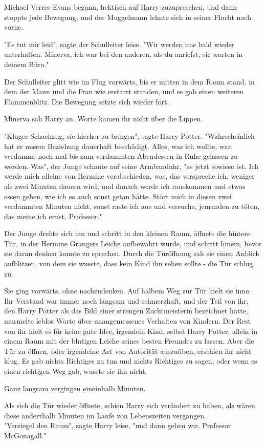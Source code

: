 {Michael Verres-Evans begann, hektisch auf Harry zuzupreschen, und dann stoppte jede Bewegung, und der Muggelmann lehnte sich in seiner Flucht nach vorne.

"Es tut mir leid", sagte der Schulleiter leise. "Wir werden uns bald wieder unterhalten. Minerva, ich war bei den anderen, als du anriefst, sie warten in deinem Büro."

Der Schulleiter glitt wie im Flug vorwärts, bis er mitten in dem Raum stand, in dem der Mann und die Frau wie erstarrt standen, und es gab einen weiteren Flammenblitz. Die Bewegung setzte sich wieder fort.

Minerva sah Harry an. Worte kamen ihr nicht über die Lippen.

"Kluger Schachzug, sie hierher zu bringen", sagte Harry Potter. "Wahrscheinlich hat er unsere Beziehung dauerhaft beschädigt. Alles, was ich wollte, war, verdammt noch mal bis zum verdammten Abendessen in Ruhe gelassen zu werden. Was", der Junge schaute auf seine Armbanduhr, "es jetzt sowieso ist. Ich werde mich alleine von Hermine verabschieden, was, das verspreche ich, weniger als zwei Minuten dauern wird, und danach werde ich rauskommen und etwas essen gehen, wie ich es auch sonst getan hätte. Stört mich in diesen zwei verdammten Minuten nicht, sonst raste ich aus und versuche, jemanden zu töten, das meine ich ernst, Professor."

Der Junge drehte sich um und schritt in den kleinen Raum, öffnete die hintere Tür, in der Hermine Grangers Leiche aufbewahrt wurde, und schritt hinein, bevor sie daran denken konnte zu sprechen. Durch die Türöffnung sah sie einen Anblick aufblitzen, von dem sie wusste, dass kein Kind ihn sehen sollte - die Tür schlug zu.

Sie ging vorwärts, ohne nachzudenken. Auf halbem Weg zur Tür hielt sie inne. Ihr Verstand war immer noch langsam und schmerzhaft, und der Teil von ihr, den Harry Potter als das Bild einer strengen Zuchtmeisterin bezeichnet hätte, murmelte leblos Worte über unangemessenes Verhalten von Kindern. Der Rest von ihr hielt es für keine gute Idee, irgendein Kind, selbst Harry Potter, allein in einem Raum mit der blutigen Leiche seines besten Freundes zu lassen. Aber die Tür zu öffnen, oder irgendeine Art von Autorität auszuüben, erschien ihr nicht klug. Es gab nichts Richtiges zu tun und nichts Richtiges zu sagen; oder wenn es einen richtigen Weg gab, wusste sie ihn nicht.

Ganz langsam vergingen eineinhalb Minuten.

Als sich die Tür wieder öffnete, schien Harry sich verändert zu haben, als wären diese anderthalb Minuten im Laufe von Lebenszeiten vergangen.\\ "Versiegel den Raum", sagte Harry leise, "und dann gehen wir, Professor McGonagall."

}
